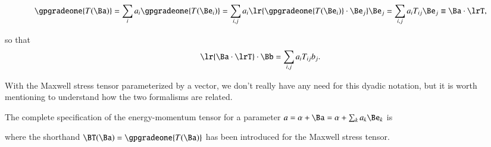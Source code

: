 \begin{dmath}\label{eqn:poyntingF:1140}
\gpgradeone{ T(\Ba) }
=
\sum_i a_i \gpgradeone{ T(\Be_i) }
=
\sum_{i,j} a_i \lr{ \gpgradeone{ T(\Be_i) } \cdot \Be_j } \Be_j
=
\sum_{i,j} a_i T_{ij} \Be_j
\equiv
\Ba \cdot \lrT,
\end{dmath}

so that
\begin{dmath}\label{eqn:poyntingF:1160}
\lr{ \Ba \cdot \lrT } \cdot \Bb
=
\sum_{i,j} a_i T_{ij} b_j.
\end{dmath}

With the Maxwell stress tensor parameterized by a vector, we don't really have any need for this dyadic notation, but it is worth mentioning to
understand how the two formalisms are related.

The complete specification of the energy-momentum tensor for a parameter \( a = \alpha + \Ba = \alpha + \sum_k a_k \Be_k \) is


where the shorthand \( \BT(\Ba) = \gpgradeone{T(\Ba)} \) has been introduced for the Maxwell stress tensor.

